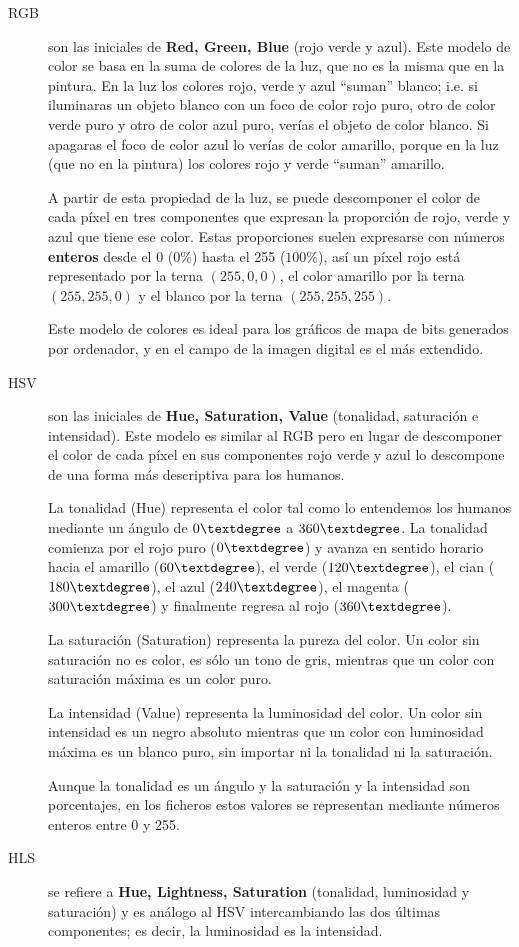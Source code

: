 \begin{description}

\item[RGB] son las  iniciales de {\bf Red, Green, Blue}  (rojo verde y
azul). Este modelo de  color se basa en la suma de  colores de la luz,
que no  es la misma  que en  la pintura. En  la luz los  colores rojo,
verde y azul ``suman'' blanco; i.e. si iluminaras un objeto blanco con
un foco de color  rojo puro, otro de color verde puro  y otro de color
azul puro,  verías el objeto de  color blanco. Si apagaras  el foco de
color azul lo verías de color amarillo, porque en la luz (que no en la
pintura) los colores rojo y verde ``suman'' amarillo.

A partir de esta propiedad de la luz, se puede descomponer el color de
cada píxel  en tres  componentes que expresan  la proporción  de rojo,
verde y azul que tiene ese color. Estas proporciones suelen expresarse
con números {\bf  enteros} desde el  0 ($0\%$) hasta el  255 ($100\%$),
así un píxel rojo está representado por la terna $(255,0,0)$, el color
amarillo  por  la  terna  $(255,255,0)$  y  el  blanco  por  la  terna
$(255,255,255)$.

Este modelo  de colores  es ideal  para los gráficos  de mapa  de bits
generados por ordenador, y en el campo  de la imagen digital es el más
extendido.

\item[HSV]  son   las  iniciales  de  {\bf   Hue,  Saturation,  Value}
(tonalidad, saturación e  intensidad). Este modelo es  similar al RGB
pero en lugar de descomponer el color de cada píxel en sus componentes
rojo verde y azul lo descompone  de una forma más descriptiva para los
humanos.

La  tonalidad (Hue)  representa el  color tal  como lo  entendemos los
humanos  mediante  un  ángulo de  $0\textdegree$  a  $360\textdegree$.
La  tonalidad comienza  por  el rojo  puro  ($0\textdegree$) y  avanza
en  sentido   horario     hacia  el  amarillo   ($60\textdegree$),  el
verde   ($120\textdegree$),  el   cian  ($180\textdegree$),   el  azul
($240\textdegree$), el magenta ($300\textdegree$) y finalmente regresa
al rojo ($360\textdegree$).

La saturación  (Saturation) representa la  pureza del color.  Un color
sin saturación no  es color, es sólo  un tono de gris,  mientras que un
color con saturación máxima es un color puro.

La  intensidad  (Value)  representa   la  luminosidad del color.
Un  color  sin intensidad es un negro absoluto  mientras que un color
con luminosidad máxima  es  un  blanco  puro,  sin importar  ni  la
tonalidad  ni  la saturación.

Aunque la tonalidad  es un ángulo y la saturación  y la intensidad son
porcentajes, en  los ficheros estos  valores se representan mediante
números enteros entre  0 y 255.

\item[HLS] se  refiere a {\bf Hue,  Lightness, Saturation} (tonalidad,
luminosidad y saturación)  y es análogo al HSV  intercambiando las dos
últimas componentes; es decir, la luminosidad es la intensidad.

\end{description}

